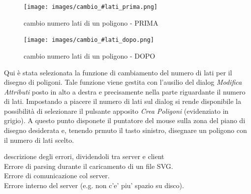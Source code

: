 \begin{figure}[!ht]
\centering
\texttt{[image: images/cambio\_\#lati\_prima.png]}
\caption{cambio numero lati di un poligono  - PRIMA}
\end{figure} 

\begin{figure}[!ht]
\centering
\texttt{[image: images/cambio\_\#lati\_dopo.png]}
\caption{cambio numero lati di un poligono  - DOPO}
\end{figure} 

\vspace{100pt}
Qui \`e stata selezionata la funzione di cambiamento del numero di lati per il disegno di poligoni. Tale funzione viene gestita con l'ausilio del dialog \textit{Modifica Attributi} posto in alto a destra e precisamente nella parte riguardante il numero di lati. Impostando a piacere il numero di lati sul dialog si rende disponibile la possibilit\`a di selezionare il pulsante apposito \textit{Crea Poligoni} (evidenziato in grigio). A questo punto disponete il puntatore del mouse sulla zona del piano di disegno desiderata e, tenendo prmuto il tasto sinistro, disegnare un poligono con il numero di lati scelto.  


descrizione degli errori, dividendoli tra server e client\\
Errore di parsing durante il caricamento di un file SVG.\\
Errore di comunicazione col server. \\
Errore interno del server (e.g. non c'e' piu' spazio su disco).\\


